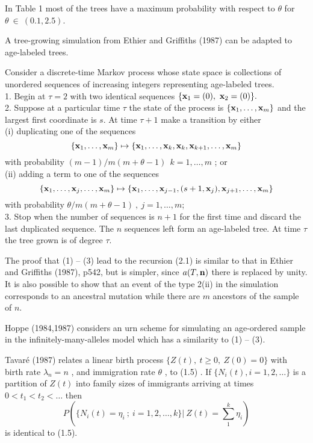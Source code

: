 	In Table 1 most of the trees have a maximum probability with respect
to $\theta$ for $\theta ~\in ~(0.1,2.5)$.

\vspace{0.5cm}
    A tree-growing simulation from Ethier and Griffiths (1987) can be adapted
to age-labeled trees.

    Consider a discrete-time Markov process whose state space is collections of
unordered sequences of increasing integers representing age-labeled trees.\\
1. Begin at $\tau = 2$ with two identical sequences
$\{{\bf x}_1 = (0),~{\bf  x}_2 = (0)\}.$\\
2. Suppose at a particular time $\tau$ the state of the process is
$\{{\bf x}_1, \ldots ,{\bf x}_m\}$ and the largest first coordinate is $s$. 
At time
$\tau + 1$ make a transition by either\\
(i) duplicating one of the sequences
$$\{{\bf x}_1, \ldots ,{\bf x}_m\} \mapsto 
\{{\bf x}_1, \ldots ,{\bf x}_k,{\bf x}_k,{\bf x}_{k+1}, \ldots
,{\bf x}_m\}$$
with probability $(m - 1)/m(m + \theta -1)~~k = 1, \ldots , m$ ; or\\
(ii) adding a term to one of the sequences
$$\{{\bf x}_1, \ldots ,{\bf x}_j, \ldots ,{\bf x}_m\} \mapsto 
\{{\bf x}_1, \ldots , 
{\bf x}_{j-1},(s+1,{\bf x}_j),{\bf x}_{j+1}, \ldots ,{\bf x}_m\}$$
with probability $\theta/ m(m + \theta - 1)~,~j = 1, \ldots ,m$;\\
3. Stop when the number of sequences is $n+1$ for the first time and discard
the last duplicated sequence. The $n$ sequences left form an age-labeled tree.
At time $\tau$ the tree grown is of degree $\tau$.

    The proof that (1) -- (3) lead to the recursion (2.1) is similar to that in
Ethier and Griffiths (1987), p542, but is simpler, since $a(T,{\bf  n})$
there is replaced by unity. It is also possible to show that an event of the type 2(ii) in the simulation corresponds to an ancestral mutation while there are $m$ ancestors of the sample of $n$. 

    Hoppe (1984,1987) considers an urn scheme for simulating an age-ordered
sample in the infinitely-many-alleles model which has a similarity to
(1) -- (3).
\vspace{0.5cm}

    Tavar\'{e} (1987) relates a linear birth process
$\{Z(t),~t \geq 0,~Z(0) = 0\}$ with birth rate $\lambda_n = n$ ,
and immigration rate $\theta$ , to (1.5) . If $\{N_i(t), i = 1,2, \ldots \}$
is a partition of $Z(t)$ into family sizes of immigrants arriving at times
$0 < t_1 < t_2 < \ldots$ then
$$P(\{N_i(t) = \eta_i~;~i = 1, 2, \ldots , k\}|~Z(t) = \sum_1^k\eta_i)$$
is identical to (1.5).

